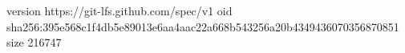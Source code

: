 version https://git-lfs.github.com/spec/v1
oid sha256:395e568c1f4db5e89013e6aa4aac22a668b543256a20b4349436070356870851
size 216747
